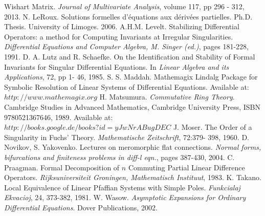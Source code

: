 \documentclass[final,1p,times,number,amsthm]{elsart}
\begin{document}
\begin{thebibliography}{00}
  Wishart Matrix. \textit{Journal of Multivariate Analysis}, volume 117, pp 296 -
  312, 2013.
 N. LeRoux. Solutions formelles d'\'equations aux d\'eriv\'ees
  partielles. Ph.D. Thesis. University of Limoges. 2006.
 A.H.M. Levelt. Stabilizing Differential Operators: a method for
  Computing Invariants at Irregular Singularities. \textit{Differential Equations
    and Computer Algebra, M. Singer (ed.)}, pages 181-228, 1991.
     D. A. Lutz and R. Schaefke. On the Identification and Stability of Formal Invariants for Singular Differential Equations. In \textit{Linear Algebra and its Applications}, 72, pp 1- 46, 1985. 
 S. S. Maddah. Mathemagix Lindalg Package for Symbolic
  Resolution of Linear Systems of Differential Equations. Available at:
  $http://www.mathemagix.org$
 H. Matsumura. \textit{Commutative Ring Theory}. Cambridge
  Studies in Advanced Mathematics, Cambridge University Press, ISBN 9780521367646,
  1989. Available at: $http://books.google.de/books?id=yJwNrABugDEC$
 J. Moser. The Order of a Singularity in Fuchs' Theory.
  \textit{Mathematische Zeitschrift}, 72:379- 398, 1960.
 D. Novikov, S. Yakovenko. Lectures on meromorphic flat
  connections. \textit{Normal forms, bifurcations and finiteness problems in
    diff-l eqn.}, pages 387-430, 2004.
     C. Praagman. Formal Decomposition of $n$ Commuting Partial Linear Difference Operators. \textit{Rijksuniversiteit Groningen, Mathematisch Instituut}, 1983.
     K. Takano. Local Equivalence of Linear Pfaffian Systems with Simple Poles. \textit{Funkcialaj Ekvacioj}, 24, 373-382, 1981.
 W. Wasow. \textit{Asymptotic Expansions for Ordinary Differential
    Equations}. Dover Publications, 2002.


\end{thebibliography}
\end{document}
